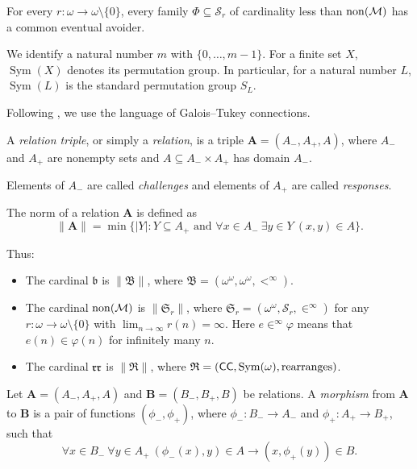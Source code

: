 \begin{theorem}\label{thm:slaloms}
For every $r:\omega\to\omega\setminus\{0\}$, every family
$\Phi\subseteq{\mathcal S}_r$ of cardinality less than $\operatorname{non}(\mathcal M)$
has a common eventual avoider.
\end{theorem}
We identify a natural number $m$ with $\{0,\ldots,m-1\}$. For a finite set $X$, $\operatorname{Sym}(X)$
denotes its permutation group.
In particular, for a natural number $L$, $\operatorname{Sym}(L)$ is the standard permutation group $S_L$.

Following \cite{BlassHandbook}, we use the language of Galois--Tukey connections.

\begin{definition}
      A \emph{relation triple}, or simply a \emph{relation}, is a triple $\mathbf A=(A_-,A_+,A)$, where $A_-$ and $A_+$ are nonempty sets and $A\subseteq A_-\times A_+$ has domain $A_-$.

      Elements of $A_-$ are called \emph{challenges} and elements of $A_+$ are called \emph{responses}.

      The norm of a relation $\mathbf A$ is defined as
      \[
            \|\mathbf A\|=\min\{|Y|:Y\subseteq A_+\text{ and }\forall x\in A_-\ \exists y\in Y\ (x,y)\in A\}.
      \]
\end{definition}

Thus:
\begin{itemize}
      \item The cardinal $\mathfrak b$ is $\|\mathfrak B\|$, where $\mathfrak B=(\omega^\omega,\omega^\omega,<^{\infty})$.
      \item The cardinal $\operatorname{non}(\mathcal M)$ is $\|\mathfrak S_r\|$, where $\mathfrak S_r=(\omega^\omega,{\mathcal S}_r,\in^\infty)$ for any $r:\omega\to\omega\setminus\{0\}$ with $\lim_{n\to\infty}r(n)=\infty$.
      Here $e\in^\infty\varphi$ means that $e(n)\in\varphi(n)$ for infinitely many $n$.
      \item The cardinal $\mathfrak{rr}$ is $\|\mathfrak R\|$, where $\mathfrak R=(\mathsf{CC},\operatorname{Sym}(\omega),\text{rearranges})$.
\end{itemize}

\begin{definition}
      Let $\mathbf A=(A_-,A_+,A)$ and $\mathbf B=(B_-,B_+,B)$ be relations. A \emph{morphism} from $\mathbf A$ to $\mathbf B$ is a pair of functions $(\phi_-,\phi_+)$, where $\phi_-:B_-\to A_-$ and $\phi_+:A_+\to B_+$, such that
      \[
            \forall x\in B_-\ \forall y\in A_+\ (\phi_-(x),y)\in A\rightarrow(x,\phi_+(y))\in B.
      \]
\end{definition}

